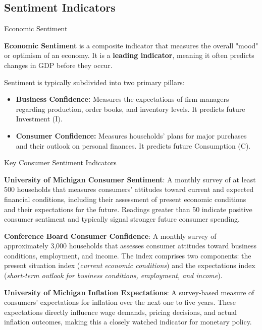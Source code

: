 \documentclass[10pt]{article}
\begin{document}
  \subsection{Sentiment Indicators}

    \begin{core}{Economic Sentiment}

        \textbf{Economic Sentiment} is a composite indicator that measures the overall "mood" or optimism of an economy. It is a \textbf{leading indicator}, meaning it often predicts changes in GDP before they occur.

        Sentiment is typically subdivided into two primary pillars:

        \begin{itemize}

            \item \textbf{Business Confidence:} Measures the expectations of firm managers regarding production, order books, and inventory levels. It predicts future Investment (I).

            \item \textbf{Consumer Confidence:} Measures households' plans for major purchases and their outlook on personal finances. It predicts future Consumption (C).

        \end{itemize}

    \end{core}

    \begin{core}{Key Consumer Sentiment Indicators}

      \textbf{University of Michigan Consumer Sentiment}: A monthly survey of at least 500 households that measures consumers' attitudes toward current and expected financial conditions, including their assessment of present economic conditions and their expectations for the future. Readings greater than 50 indicate positive consumer sentiment and typically signal stronger future consumer spending.

      \textbf{Conference Board Consumer Confidence}: A monthly survey of approximately 3,000 households that assesses consumer attitudes toward business conditions, employment, and income. The index comprises two components: the present situation index (\textit{current economic conditions}) and the expectations index (\textit{short-term outlook for business conditions, employment, and income}).

      \textbf{University of Michigan Inflation Expectations}: A survey-based measure of consumers' expectations for inflation over the next one to five years. These expectations directly influence wage demands, pricing decisions, and actual inflation outcomes, making this a closely watched indicator for monetary policy.

    \end{core} 
\end{document}
